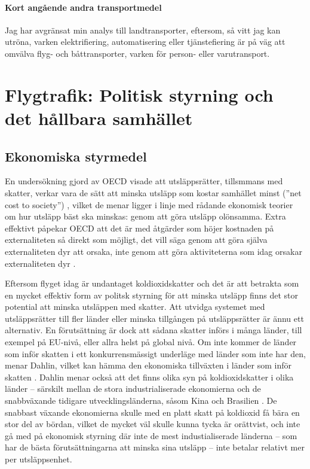 \documentclass{article}
\begin{document}
\paragraph{Kort angående andra transportmedel}
Jag har avgränsat min analys till landtransporter, eftersom, så vitt jag kan utröna, varken elektrifiering, automatisering eller tjänstefiering är på väg att omvälva flyg- och båttransporter, varken för person- eller varutransport.


\clearpage
\section{Flygtrafik: Politisk styrning och det hållbara samhället}

\subsection{Ekonomiska styrmedel}

En undersökning gjord av OECD visade att utsläppsrätter, tillsmmans med skatter, verkar vara de  sätt att minska utsläpp som kostar samhället minst (''net cost to society'') , vilket de menar ligger i linje med rådande ekonomisk teorier om hur utsläpp bäst ska minskas: genom att göra utsläpp olönsamma. Extra effektivt påpekar OECD att det är med åtgärder som höjer kostnaden på externaliteten så direkt som möjligt, det vill säga genom att göra själva externaliteten dyr att orsaka, inte genom att göra aktiviteterna som idag orsakar externaliteten dyr .

Eftersom flyget idag är undantaget koldioxidskatter  och det är att betrakta som en mycket effektiv form av politsk styrning för att minska utsläpp finns det stor potential att minska utsläppen med skatter. Att utvidga systemet med utsläppsrätter till fler länder eller minska tillgången på utsläppsrätter är ännu  ett alternativ. En förutsättning är dock att sådana skatter införs i många länder, till exempel på EU-nivå, eller allra helst på global nivå. Om inte kommer de länder som inför skatten i ett konkurrensmässigt underläge med länder som inte har den, menar Dahlin, vilket kan hämma den ekonomiska tillväxten i länder som inför skatten . Dahlin menar också att det finns olika syn på koldioxidskatter i olika länder – särskilt mellan de stora industrialiserade ekonomierna och de snabbväxande tidigare utvecklingsländerna, såsom Kina och Brasilien . De snabbast växande ekonomierna skulle med en platt skatt på koldioxid få bära en stor del av bördan, vilket de mycket väl skulle kunna tycka är orättvist, och inte gå med på ekonomisk styrning där inte de mest industialiserade länderna – som har de bästa förutsättningarna att minska sina utsläpp – inte betalar relativt mer per utsläppsenhet.
\end{document}

